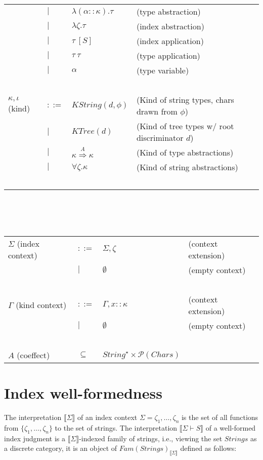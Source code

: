 \documentclass{article}
\newcommand{\sem}[1]{\llbracket #1 \rrbracket}
\begin{document}
\begin{tabular}{llll}
       & $\mid$ & $\lambda (\alpha :: \kappa). \tau$ & (type abstraction) \\
       & $\mid$ & $\lambda \zeta. \tau$ & (index abstraction) \\
       & $\mid$ & $\tau~[S]$ & (index application) \\
       & $\mid$ & $\tau~\tau$ & (type application) \\
       & $\mid$ & $\alpha$ & (type variable) \\~\\
$\kappa, \iota$ (kind) & $::=$ & $\mathit{KString}(d,\phi)$ & (Kind of string types, chars drawn from $\phi$) \\
                       & $\mid$ & $\mathit{KTree}(d)$ & (Kind of tree types w/ root discriminator $d$) \\
                       & $\mid$ & $\kappa \overset{A}{\Rightarrow} \kappa$ & (Kind of type abstractions) \\
                       & $\mid$ & $\forall \zeta. \kappa$ & (Kind of string abstractions) \\~\\
\end{tabular}\\~\\~\\
\begin{tabular}{llll}
$\Sigma$ (index context) & $::=$ & $\Sigma,\zeta$ & (context extension) \\
                         & $\mid$ & $\emptyset$ & (empty context) \\~\\
$\Gamma$ (kind context) & $::=$ & $\Gamma,x :: \kappa$ & (context extension) \\
                           & $\mid$ & $\emptyset$ & (empty context) \\~\\
$A$ (coeffect) & $\subseteq$ & $\mathit{String}^\star \times \mathcal P(\mathit{Chars})$ & ~ 
\end{tabular}

\section*{Index well-formedness}

The interpretation $\sem{\Sigma}$ of an index context $\Sigma = \zeta_1, \ldots, \zeta_n$ is the set of all functions from $\{ \zeta_1, \ldots, \zeta_n \}$ to the set of strings. The interpretation $\sem{\Sigma \vdash S}$ of a well-formed index judgment is a $\sem{\Sigma}$-indexed family of strings, i.e., viewing the set $\mathit{Strings}$ as a discrete category, it is an object of $\mathit{Fam}(\mathit{Strings})_{\sem{\Sigma}}$ defined as follows:
\end{document}
